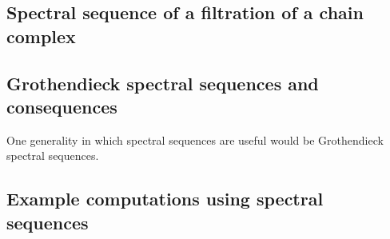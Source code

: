 \subsection{Spectral sequence of a filtration of a chain complex}






\subsection{Grothendieck spectral sequences and consequences}

One generality in which spectral sequences are useful would be Grothendieck spectral sequences.








\subsection{Example computations using spectral sequences}

